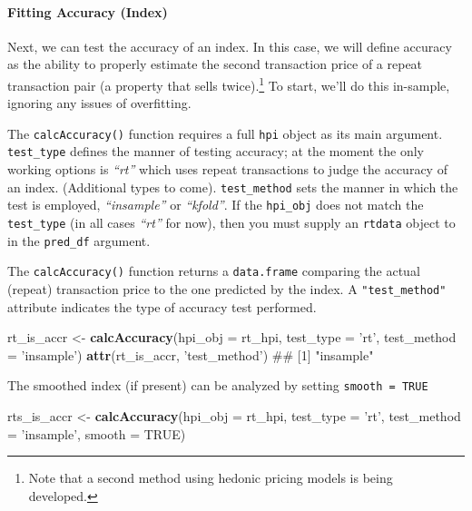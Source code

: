\documentclass[]{article}
\newenvironment{Shaded}{\begin{snugshade}}{\end{snugshade}}
\newcommand{\KeywordTok}[1]{\textcolor[rgb]{0.13,0.29,0.53}{\textbf{#1}}}
\newcommand{\DataTypeTok}[1]{\textcolor[rgb]{0.13,0.29,0.53}{#1}}
\newcommand{\StringTok}[1]{\textcolor[rgb]{0.31,0.60,0.02}{#1}}
\newcommand{\OtherTok}[1]{\textcolor[rgb]{0.56,0.35,0.01}{#1}}
\newcommand{\NormalTok}[1]{#1}
\let\oldparagraph\paragraph
\renewcommand{\paragraph}[1]{\oldparagraph{#1}\mbox{}}
\let\rmarkdownfootnote\footnote%
\def\footnote{\protect\rmarkdownfootnote}
\begin{document}
\paragraph{Fitting Accuracy (Index)}\label{fitting-accuracy-index}

Next, we can test the accuracy of an index. In this case, we will define
accuracy as the ability to properly estimate the second transaction
price of a repeat transaction pair (a property that sells
twice).\footnote{Note that a second method using hedonic pricing models
  is being developed.} To start, we'll do this in-sample, ignoring any
issues of overfitting.

The \texttt{calcAccuracy()} function requires a full \texttt{hpi} object
as its main argument. \texttt{test\_type} defines the manner of testing
accuracy; at the moment the only working options is \emph{``rt''} which
uses repeat transactions to judge the accuracy of an index. (Additional
types to come). \texttt{test\_method} sets the manner in which the test
is employed, \emph{``insample''} or \emph{``kfold''}. If the
\texttt{hpi\_obj} does not match the \texttt{test\_type} (in all cases
\emph{``rt''} for now), then you must supply an \texttt{rtdata} object
to in the \texttt{pred\_df} argument.

The \texttt{calcAccuracy()} function returns a \texttt{data.frame}
comparing the actual (repeat) transaction price to the one predicted by
the index. A \texttt{"test\_method"} attribute indicates the type of
accuracy test performed.

\begin{Shaded}
\begin{Highlighting}[]
\NormalTok{   rt_is_accr <-}\StringTok{ }\KeywordTok{calcAccuracy}\NormalTok{(}\DataTypeTok{hpi_obj =}\NormalTok{ rt_hpi,}
                              \DataTypeTok{test_type =} \StringTok{'rt'}\NormalTok{,}
                              \DataTypeTok{test_method =} \StringTok{'insample'}\NormalTok{)}
   \KeywordTok{attr}\NormalTok{(rt_is_accr, }\StringTok{'test_method'}\NormalTok{)}
\NormalTok{## [1] "insample"}
\end{Highlighting}
\end{Shaded}

The smoothed index (if present) can be analyzed by setting
\texttt{smooth\ =\ TRUE}

\begin{Shaded}
\begin{Highlighting}[]
\NormalTok{    rts_is_accr <-}\StringTok{ }\KeywordTok{calcAccuracy}\NormalTok{(}\DataTypeTok{hpi_obj =}\NormalTok{ rt_hpi,}
                                \DataTypeTok{test_type =} \StringTok{'rt'}\NormalTok{,}
                                \DataTypeTok{test_method =} \StringTok{'insample'}\NormalTok{,}
                                \DataTypeTok{smooth =} \OtherTok{TRUE}\NormalTok{)}
\end{Highlighting}
\end{Shaded}
\end{document}
